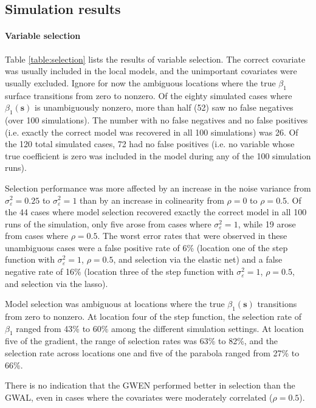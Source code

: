 \documentclass[authoryear, review, 11pt]{elsarticle}
\begin{document}
	\subsection{Simulation results}	
	\paragraph{Variable selection} Table \ref{table:selection} lists the results of variable selection. The correct covariate was usually included in the local models, and the unimportant covariates were usually excluded. Ignore for now the ambiguous locations where the true $\beta_1$ surface transitions from zero to nonzero. Of the eighty simulated cases where $\beta_1(\bm{s})$ is unambiguously nonzero, more than half (52) saw no false negatives (over 100 simulations). The number with no false negatives and no false positives (i.e. exactly the correct model was recovered in all 100 simulations) was 26. Of the 120 total simulated cases, 72 had no false positives (i.e. no variable whose true coefficient is zero was included in the model during any of the 100 simulation runs). 
	
	Selection performance was more affected by an increase in the noise variance from $\sigma^2_{\varepsilon}=0.25$ to $\sigma^2_{\varepsilon}=1$ than by an increase in colinearity from $\rho = 0$ to $\rho = 0.5$. Of the 44 cases where model selection recovered exactly the correct model in all 100 runs of the simulation, only five arose from cases where $\sigma^2_{\varepsilon}=1$, while 19 arose from cases where $\rho = 0.5$. The worst error rates that were observed in these unambiguous cases were a false positive rate of 6\% (location one of the step function with $\sigma^2_{\varepsilon}=1$, $\rho=0.5$, and selection via the elastic net) and a false negative rate of 16\% (location three of the step function with $\sigma^2_{\varepsilon}=1$, $\rho=0.5$, and selection via the lasso).
			
	Model selection was ambiguous at locations where the true $\beta_1(\bm{s})$ transitions from zero to nonzero. At location four of the step function, the selection rate of $\beta_1$ ranged from 43\% to 60\% among the different simulation settings. At location five of the gradient, the range of selection rates was 63\% to 82\%, and the selection rate across locations one and five of the parabola ranged from 27\% to 66\%. 

	There is no indication that the GWEN performed better in selection than the GWAL, even in cases where the covariates were moderately correlated ($\rho=0.5$).
	
\end{document}
